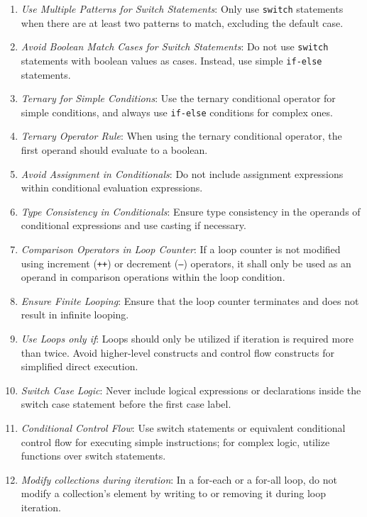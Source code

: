 \documentclass[9pt]{IEEEtran} %
\begin{document}
\begin{enumerate}
  \item \textit{Use Multiple Patterns for Switch Statements}: Only use \texttt{switch} statements when there are at least two patterns to match, excluding the default case.
  \item \textit{Avoid Boolean Match Cases for Switch Statements}: Do not use \texttt{switch} statements with boolean values as cases. Instead, use simple \texttt{if-else} statements. 
  \item \textit{Ternary for Simple Conditions}: Use the ternary conditional operator for simple conditions, and always use \texttt{if-else} conditions for complex ones.
  \item \textit{Ternary Operator Rule}: When using the ternary conditional operator, the first operand should evaluate to a boolean.
  \item \textit{Avoid Assignment in Conditionals}: Do not include assignment expressions within conditional evaluation expressions.
  \item \textit{Type Consistency in Conditionals}: Ensure type consistency in the operands of conditional expressions and use casting if necessary.
  \item \textit{Comparison Operators in Loop Counter}: If a loop counter is not modified using increment (\texttt{++}) or decrement (\texttt{--}) operators, it shall only be used as an operand in comparison operations within the loop condition.
  \item \textit{Ensure Finite Looping}: Ensure that the loop counter terminates and does not result in infinite looping.
  \item \textit{Use Loops only if}: Loops should only be utilized if iteration is required more than twice. Avoid higher-level constructs and control flow constructs for simplified direct execution.
  \item \textit{Switch Case Logic}: Never include logical expressions or declarations inside the switch case statement before the first case label.
  \item \textit{Conditional Control Flow}: Use switch statements or equivalent conditional control flow for executing simple instructions; for complex logic, utilize functions over switch statements.
  \item \textit{Modify collections during iteration}: In a for-each or a for-all loop, do not modify a collection's element by writing to or removing it during loop iteration.
\end{enumerate}
\end{document}
